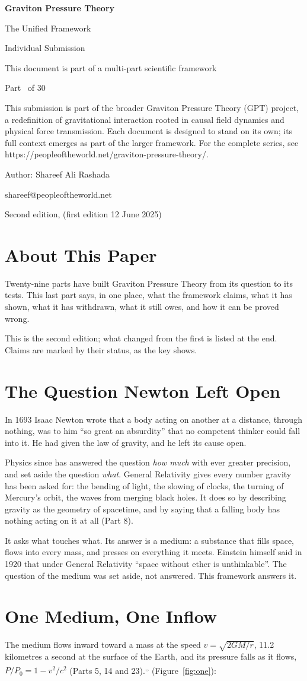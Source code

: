 \documentclass[11pt,a4paper]{article}
\makeatletter
\newcommand{\gptitle}{%
  \begin{titlepage}\centering
  \vspace*{3cm}
  {\Huge\bfseries Graviton Pressure Theory\par}\vspace{0.8cm}
  {\Large The Unified Framework\par}\vspace{0.2cm}
  {\large Individual Submission\par}\vspace{0.6cm}
  {\normalsize This document is part of a multi-part scientific framework\par}\vspace{2cm}
  {\normalsize Part \gptpart\ of 30\par}\vspace{0.8cm}
  {\huge\bfseries \gpttitle\par}\vspace{0.6cm}
  {\Large \gptsubtitle\par}\vspace{1.5cm}
  {\small\begin{minipage}{0.75\textwidth}\centering This submission is part of the broader Graviton Pressure Theory (GPT) project, a redefinition of gravitational interaction rooted in causal field dynamics and physical force transmission. Each document is designed to stand on its own; its full context emerges as part of the larger framework. For the complete series, see https://peopleoftheworld.net/graviton-pressure-theory/.\end{minipage}\par}
  \vfill
  {\large Author: Shareef Ali Rashada\par}\vspace{0.2cm}
  {\normalsize shareef@peopleoftheworld.net\par}\vspace{0.5cm}
  {\normalsize Second edition, \gptdate \quad (first edition 12 June 2025)\par}
  \end{titlepage}
  \setcounter{page}{1}\tableofcontents\clearpage}
\makeatother
\begin{document}
\gptitle

\section*{About This Paper}

Twenty-nine parts have built Graviton Pressure Theory from its question to its tests. This last part says, in one place, what the framework claims, what it has shown, what it has withdrawn, what it still owes, and how it can be proved wrong.

This is the second edition; what changed from the first is listed at the end. Claims are marked by their status, as the key shows.

\statuskey

\section{The Question Newton Left Open}

In 1693 Isaac Newton wrote that a body acting on another at a distance, through nothing, was to him ``so great an absurdity'' that no competent thinker could fall into it. He had given the law of gravity, and he left its cause open.

Physics since has answered the question \emph{how much} with ever greater precision, and set aside the question \emph{what}. General Relativity gives every number gravity has been asked for: the bending of light, the slowing of clocks, the turning of Mercury's orbit, the waves from merging black holes. It does so by describing gravity as the geometry of spacetime, and by saying that a falling body has nothing acting on it at all (Part 8).

 It asks what touches what. Its answer is a medium: a substance that fills space, flows into every mass, and presses on everything it meets. Einstein himself said in 1920 that under General Relativity ``space without ether is unthinkable''. The question of the medium was set aside, not answered. This framework answers it.

\section{One Medium, One Inflow}\label{sec:one}

 The medium flows inward toward a mass at the speed $v=\sqrt{2GM/r}$, 11.2 kilometres a second at the surface of the Earth, and its pressure falls as it flows, $P/P_0 = 1 - v^2/c^2$ (Parts 5, 14 and 23).\textsuperscript{,}\textsuperscript{,}  (Figure~\ref{fig:one}):
\end{document}
